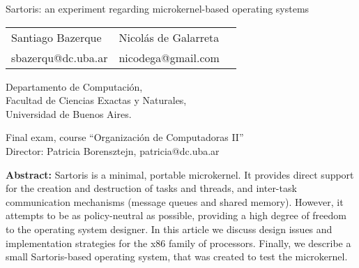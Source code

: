 \documentclass[12pt, letterpaper, oneside, english]{article}
\begin{document}
\begin{center}
\begin{huge}
Sartoris: an experiment regarding microkernel-based operating systems \\
\end{huge}
\end{center}

\vspace{0.5cm}

\begin{center}
\begin{tabular}{lll}
Santiago Bazerque & Nicol\'as de Galarreta \\
sbazerqu@dc.uba.ar & nicodega@gmail.com\\
\end{tabular}
\end{center}

\begin{small}
\begin{center}
Departamento de Computaci\'on, \\
Facultad de Ciencias Exactas y Naturales, \\
Universidad de Buenos Aires. \\
\end{center}
\end{small}

\vspace{0.5cm}
\begin{small}
\begin{center}
\noindent Final exam, course ``Organizaci\'on de Computadoras II'' \\
Director: Patricia Borensztejn, patricia@dc.uba.ar \\
\end{center}
\end{small}

\vspace{0.5cm}
\textbf{Abstract:} Sartoris is a minimal, portable microkernel. It provides direct support for the creation and destruction of tasks and threads, and inter-task communication mechanisms (message queues and shared memory). However, it attempts to be as policy-neutral as possible, providing a high degree of freedom to the operating system designer. In this article we discuss design issues and implementation strategies for the x86 family of processors. Finally, we describe a small Sartoris-based operating system, that was created to test the microkernel.

\vspace{1cm}
\end{document}
